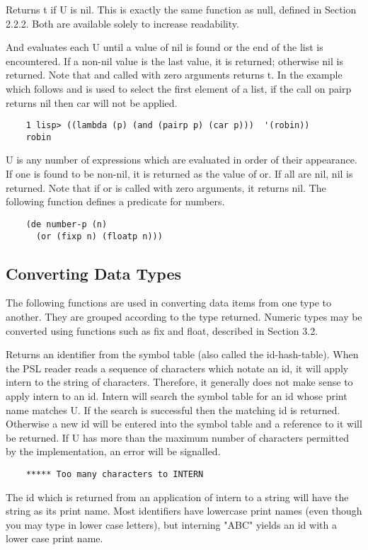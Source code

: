 {    Returns t  if U  is  nil.  This   is  exactly    the    same
    function  as  null,  defined  in  Section  2.2.2.   Both are
    available solely to increase readability.
}

{    And evaluates each U until a value of nil is  found  or  the
    end  of  the    list is encountered.  If  a non-nil value is
    the last value, it is returned; otherwise nil  is  returned.
    Note  that and called with zero arguments returns t.  In the
    example which follows  and  is  used  to  select  the  first
    element of a list, if the call on pairp returns nil then car
    will not be applied.
}
\begin{verbatim}
    1 lisp> ((lambda (p) (and (pairp p) (car p)))  '(robin))
    robin
\end{verbatim}
{    U is any number of expressions  which are evaluated in order
    of  their  appearance.  If one is found to be non-nil, it is
    returned as the value of  or.    If  all  are  nil,  nil  is
    returned.  Note that if or is called with zero arguments, it
    returns nil.  The following function defines a predicate for
    numbers.
}
\begin{verbatim}
    (de number-p (n)
      (or (fixp n) (floatp n)))
\end{verbatim}
\subsection{Converting Data Types}

The following functions are used in converting data items from
one  type  to  another.   They are grouped according to the type
returned.  Numeric types may be converted using  functions  such
as fix and float, described in Section 3.2.


{    Returns an identifier from the symbol table (also called the
    id-hash-table).   When  the  PSL  reader reads a sequence of
    characters which notate an id, it will apply intern  to  the
    string of characters.  Therefore, it generally does not make
    sense  to  apply  intern  to  an id.  Intern will search the
    symbol table for an id whose print name matches U.   If  the
    search  is  successful  then  the  matching  id is returned.
    Otherwise a new id will be entered into the symbol table and
    a reference to it will be returned.  If U has more than  the
    maximum    number    of    characters   permitted   by   the
    implementation, an error will be signalled.
}
\begin{verbatim}
    ***** Too many characters to INTERN
\end{verbatim}
    The id which is returned from an application of intern to  a
    string  will  have  the  string  as  its  print  name.  Most
    identifiers have lowercase print names (even though you  may
    type  in  lower case letters), but interning "ABC" yields an
    id with a lower case print name.

